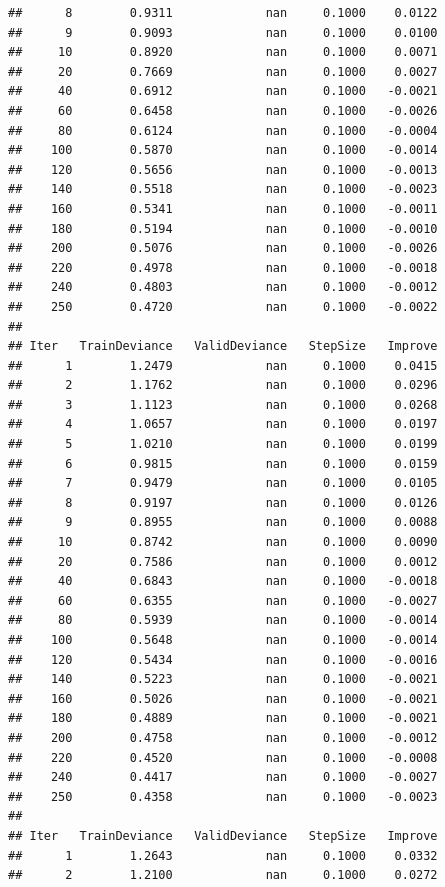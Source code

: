 \documentclass[]{book}
\begin{document}
\begin{verbatim}
##      8        0.9311             nan     0.1000    0.0122
##      9        0.9093             nan     0.1000    0.0100
##     10        0.8920             nan     0.1000    0.0071
##     20        0.7669             nan     0.1000    0.0027
##     40        0.6912             nan     0.1000   -0.0021
##     60        0.6458             nan     0.1000   -0.0026
##     80        0.6124             nan     0.1000   -0.0004
##    100        0.5870             nan     0.1000   -0.0014
##    120        0.5656             nan     0.1000   -0.0013
##    140        0.5518             nan     0.1000   -0.0023
##    160        0.5341             nan     0.1000   -0.0011
##    180        0.5194             nan     0.1000   -0.0010
##    200        0.5076             nan     0.1000   -0.0026
##    220        0.4978             nan     0.1000   -0.0018
##    240        0.4803             nan     0.1000   -0.0012
##    250        0.4720             nan     0.1000   -0.0022
## 
## Iter   TrainDeviance   ValidDeviance   StepSize   Improve
##      1        1.2479             nan     0.1000    0.0415
##      2        1.1762             nan     0.1000    0.0296
##      3        1.1123             nan     0.1000    0.0268
##      4        1.0657             nan     0.1000    0.0197
##      5        1.0210             nan     0.1000    0.0199
##      6        0.9815             nan     0.1000    0.0159
##      7        0.9479             nan     0.1000    0.0105
##      8        0.9197             nan     0.1000    0.0126
##      9        0.8955             nan     0.1000    0.0088
##     10        0.8742             nan     0.1000    0.0090
##     20        0.7586             nan     0.1000    0.0012
##     40        0.6843             nan     0.1000   -0.0018
##     60        0.6355             nan     0.1000   -0.0027
##     80        0.5939             nan     0.1000   -0.0014
##    100        0.5648             nan     0.1000   -0.0014
##    120        0.5434             nan     0.1000   -0.0016
##    140        0.5223             nan     0.1000   -0.0021
##    160        0.5026             nan     0.1000   -0.0021
##    180        0.4889             nan     0.1000   -0.0021
##    200        0.4758             nan     0.1000   -0.0012
##    220        0.4520             nan     0.1000   -0.0008
##    240        0.4417             nan     0.1000   -0.0027
##    250        0.4358             nan     0.1000   -0.0023
## 
## Iter   TrainDeviance   ValidDeviance   StepSize   Improve
##      1        1.2643             nan     0.1000    0.0332
##      2        1.2100             nan     0.1000    0.0272

\end{verbatim}
\end{document}
